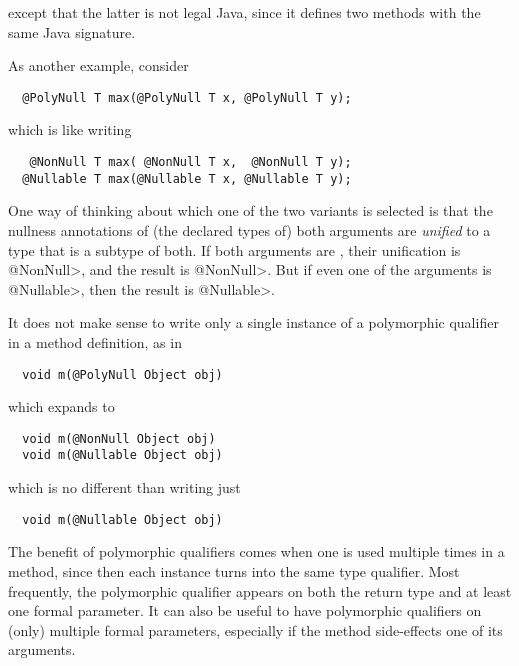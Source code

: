 \noindent
except that the latter is not legal Java, since it defines two
methods with the same Java signature.


As another example, consider

\begin{Verbatim}
  @PolyNull T max(@PolyNull T x, @PolyNull T y);
\end{Verbatim}

\noindent
which is like writing

\begin{Verbatim}
   @NonNull T max( @NonNull T x,  @NonNull T y);
  @Nullable T max(@Nullable T x, @Nullable T y);
\end{Verbatim}

\noindent
One way of thinking about which one of the two  variants is
selected is that the nullness annotations of (the declared types of) both
arguments are \emph{unified} to a type that is a subtype of both.  If both
arguments are , their unification is \<@NonNull>, and the
result is \<@NonNull>.  But if even one of the arguments is \<@Nullable>,
then the result is \<@Nullable>.



It does not make sense to write only a single instance of a polymorphic
qualifier in a method definition, as in

\begin{Verbatim}
  void m(@PolyNull Object obj)
\end{Verbatim}

\noindent
which expands to

\begin{Verbatim}
  void m(@NonNull Object obj)
  void m(@Nullable Object obj)
\end{Verbatim}

\noindent
which is no different than writing just

\begin{Verbatim}
  void m(@Nullable Object obj)
\end{Verbatim}

\noindent
The benefit of polymorphic qualifiers comes when one is used multiple times
in a method, since then each instance turns into the same type qualifier.
Most frequently, the polymorphic qualifier appears on both the return type
and at least one formal parameter.  It can also be useful to have
polymorphic qualifiers on (only) multiple formal parameters, especially if
the method side-effects one of its arguments.


